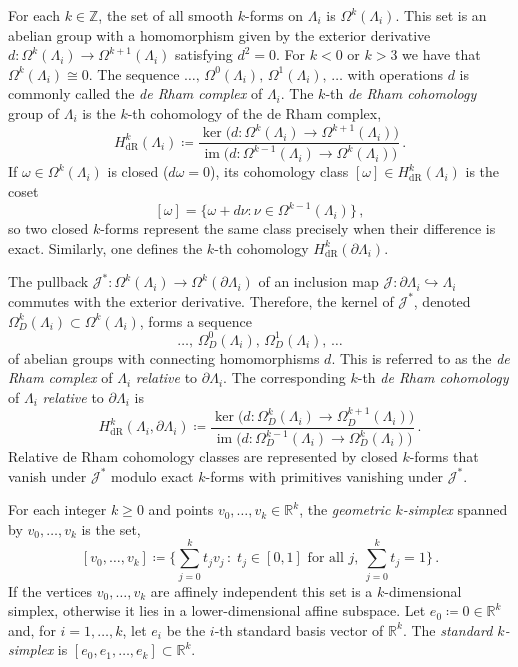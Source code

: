 \documentclass[11pt]{article}
\theoremstyle{plain}
\theoremstyle{definition}
\theoremstyle{remark}
\newcommand{\R}{\mathbb{R}}
\newcommand{\ST}{\Lambda}
\begin{document}
For each \(k \in \mathbb{Z}\), the set of all smooth \(k\)-forms on \(\ST_i\) is \(\Omega^k(\ST_i)\). This set is an abelian group with a homomorphism given by the exterior derivative \(d :\Omega^k(\ST_i)\longrightarrow\Omega^{k+1}(\ST_i)\) satisfying \(d^2 = 0\). For \(k < 0\) or \(k > 3\) we have that \(\Omega^k(\ST_i) \cong 0\). The sequence \(\dots , \, \Omega^0(\ST_i), \, \Omega^1(\ST_i), \, \dots\) with operations \(d\) is commonly called the \emph{de Rham complex} of \(\ST_i\). The \(k\)-th \emph{de Rham cohomology} group of \(\ST_i\) is the \(k\)-th cohomology of the de Rham complex,
\[
H^k_{\mathrm{dR}}(\ST_i) \coloneqq
\frac{\ker\big(d:\Omega^k(\ST_i)\to\Omega^{k+1}(\ST_i)\big)}
     {\operatorname{im}\big(d:\Omega^{k-1}(\ST_i)\to\Omega^{k}(\ST_i)\big)} \, .
\]
If \(\omega\in\Omega^k(\ST_i)\) is closed (\(d\omega=0\)), its cohomology class \([\omega]\in H^k_{\mathrm{dR}}(\ST_i)\) is the coset
\[
[\omega]=\{\omega + d\nu:\nu\in\Omega^{k-1}(\ST_i)\} \, ,
\]
so two closed \(k\)-forms represent the same class precisely when their difference is exact. Similarly, one defines the \(k\)-th cohomology \(H^k_{\mathrm{dR}} (\partial \ST_i) \). 


The pullback \(\mathcal{J}^*:\Omega^k(\ST_i)\to\Omega^k(\partial\ST_i)\) of an inclusion map \(\mathcal{J}:\partial\ST_i\hookrightarrow\ST_i\) commutes with the exterior derivative. Therefore, the kernel of \(\mathcal{J}^*\), denoted \(\Omega^k_D(\ST_i) \subset \Omega^k(\ST_i)\), forms a sequence 
\[
\dots, \, \Omega^0_D(\ST_i), \, \Omega^1_D(\ST_i), \, \dots
\] 
of abelian groups with connecting homomorphisms \(d\). This is referred to as the \emph{de Rham complex} of \(\ST_i\) \emph{relative} to \(\partial \ST_i\). The corresponding \(k\)-th \emph{de Rham cohomology} of \(\ST_i\) \emph{relative} to \(\partial \ST_i\) is
\[
H^k_{\mathrm{dR}}(\ST_i,\partial\ST_i)
\coloneqq
\frac{\ker\big(d:\Omega^k_D(\ST_i)\to\Omega^{k+1}_D(\ST_i)\big)}
     {\operatorname{im}\big(d:\Omega^{k-1}_D(\ST_i)\to\Omega^{k}_D(\ST_i)\big)} \, .
\]
Relative de Rham cohomology classes are represented by closed \(k\)-forms that vanish under \(\mathcal{J}^*\) modulo exact \(k\)-forms with primitives vanishing under \(\mathcal{J}^*\).




For each integer \(k\ge 0\) and points \(v_0,\dots,v_k \in \R^k\), the \emph{geometric \(k\)-simplex} spanned by \(v_0,\dots,v_k\) is the set,
\[
[v_0,\dots,v_k]
\coloneqq
\Bigg\{\sum_{j=0}^k t_j v_j \, :\; t_j\in[0,1]\text{ for all }j,\ \sum_{j=0}^k t_j=1\Bigg\} \, .
\]
If the vertices \(v_0,\dots,v_k\) are affinely independent this set is a \(k\)-dimensional simplex, otherwise it lies in a lower-dimensional affine subspace. Let \(e_0 \coloneqq 0\in\mathbb{R}^k\) and, for \(i=1,\dots,k\), let \(e_i\) be the \(i\)-th standard basis vector of \(\mathbb{R}^k\). The \emph{standard \(k\)-simplex} is \([e_0,e_1,\dots,e_k] \subset \R^k\). 
\end{document}
